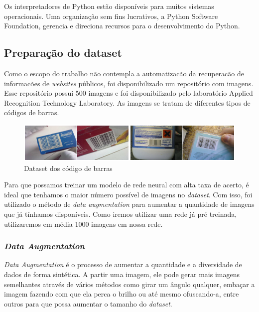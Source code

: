 Os interpretadores de Python estão disponíveis para muitos sistemas operacionais. Uma organização sem fins lucrativos, a Python Software Foundation, gerencia e direciona recursos para o desenvolvimento do Python. \cite{van2007python}


\subsection{Preparação do dataset}

Como o escopo do trabalho não contempla a automatizacão da recuperacão de informacões de \textit{websites} públicos, foi disponibilizado um repositório com imagens. Esse
repositório possui 500 imagens e foi disponibilizado pelo laboratório Applied Recognition Technology Laboratory. As imagens se tratam de diferentes tipos de códigos de barras.\cite{Arte-Lab}

\begin{figure}[htbp]
	\centering
	\includegraphics[width=1\linewidth]{figuras/MachineLearning/barcodes.png}
	\caption{Dataset dos código de barras}
	\label{fig:datasetBarcode}
\end{figure}

Para que possamos treinar um modelo de rede neural com alta taxa de acerto, é ideal que tenhamos o maior número possível de imagens no \textit{dataset}. Com isso, foi utilizado o método de \textit{data augmentation} para aumentar a quantidade de imagens que já tínhamos disponíveis. Como iremos utilizar uma rede já pré treinada, utilizaremos em média 1000 imagens em nossa rede.


\subsubsection*{\textit{Data Augmentation}}\label{sec:dataAugm}

\textit{Data Augmentation} é o processo de aumentar a quantidade e a diversidade de dados de forma sintética. A partir uma imagem, ele pode gerar mais imagens semelhantes através de vários métodos como girar um ângulo qualquer, embaçar a imagem fazendo com que ela perca o brilho ou até mesmo ofuscando-a, entre outros para que possa aumentar o tamanho do \textit{dataset}.

